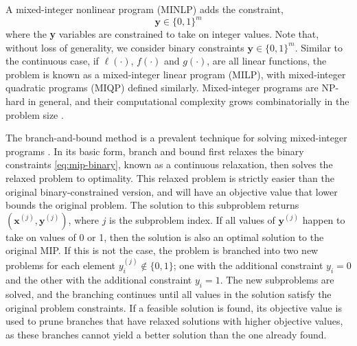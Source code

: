\documentclass[runningheads]{llncs}
\begin{document}
A mixed-integer nonlinear program (MINLP) adds the constraint,
\begin{equation}
     \textbf{y}\in\{0, 1\}^m
     \label{eq:mip-binary}
\end{equation}
where the \textbf{y} variables are constrained to take on integer values. Note that, without loss of generality, we consider binary constraints $\textbf{y} \in \{0, 1\}^m$. Similar to the continuous case, if $\ell(\cdot)$, $f(\cdot)$ and $g(\cdot)$, are all linear functions, the problem is known as a mixed-integer linear program (MILP), with mixed-integer quadratic programs (MIQP) defined similarly. Mixed-integer programs are NP-hard in general, and their computational complexity grows combinatorially in the problem size \cite{yuan2016binary}.

The branch-and-bound method is a prevalent technique for solving mixed-integer programs \cite{land_automatic_1960}. In its basic form, branch and bound first relaxes the binary constraints \eqref{eq:mip-binary}, known as a continuous relaxation, then solves the relaxed problem to optimality.
This relaxed problem is strictly easier than the original binary-constrained version, and will have an objective value that lower bounds the original problem. The solution to this subproblem returns $(\textbf{x}^{(j)}, \textbf{y}^{(j)})$, where $j$ is the subproblem index. If all values of $\textbf{y}^{(j)}$ happen to take on values of 0 or 1, then the solution is also an optimal solution to the original MIP. If this is not the case, the problem is branched into two new problems for each element $y^{(j)}_i \notin \{0, 1\}$; one with the additional constraint $y_i=0$ and the other with the additional constraint $y_i=1$. The new subproblems are solved, and the branching continues until all values in the solution satisfy the original problem constraints. If a feasible solution is found, its objective value is used to prune branches that have relaxed solutions with higher objective values, as these branches cannot yield a better solution than the one already found. 
\end{document}
